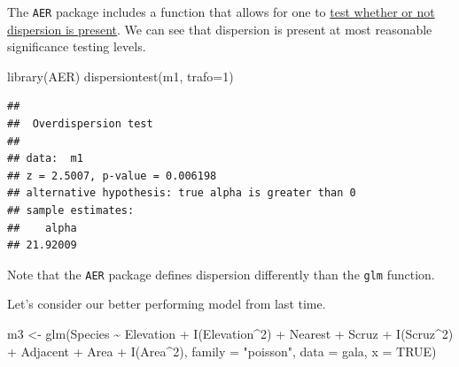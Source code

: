 \documentclass[
  ignorenonframetext,
]{beamer}
\newenvironment{Shaded}{\begin{snugshade}}{\end{snugshade}}
\newcommand{\AttributeTok}[1]{\textcolor[rgb]{0.77,0.63,0.00}{#1}}
\newcommand{\ConstantTok}[1]{\textcolor[rgb]{0.00,0.00,0.00}{#1}}
\newcommand{\DecValTok}[1]{\textcolor[rgb]{0.00,0.00,0.81}{#1}}
\newcommand{\FunctionTok}[1]{\textcolor[rgb]{0.00,0.00,0.00}{#1}}
\newcommand{\NormalTok}[1]{#1}
\newcommand{\OtherTok}[1]{\textcolor[rgb]{0.56,0.35,0.01}{#1}}
\newcommand{\SpecialCharTok}[1]{\textcolor[rgb]{0.00,0.00,0.00}{#1}}
\newcommand{\StringTok}[1]{\textcolor[rgb]{0.31,0.60,0.02}{#1}}
\begin{document}
\begin{frame}[fragile]{}
\protect\hypertarget{section-9}{}
The \texttt{AER} package includes a function that allows for one to
\href{https://www.sciencedirect.com/science/article/abs/pii/030440769090014K}{test
whether or not dispersion is present}. We can see that dispersion is
present at most reasonable significance testing levels.

\vspace{12pt}
\tiny

\begin{Shaded}
\begin{Highlighting}[]
\FunctionTok{library}\NormalTok{(AER)}
\FunctionTok{dispersiontest}\NormalTok{(m1, }\AttributeTok{trafo=}\DecValTok{1}\NormalTok{)}
\end{Highlighting}
\end{Shaded}

\begin{verbatim}
## 
##  Overdispersion test
## 
## data:  m1
## z = 2.5007, p-value = 0.006198
## alternative hypothesis: true alpha is greater than 0
## sample estimates:
##    alpha 
## 21.92009
\end{verbatim}

\vspace{12pt}
\normalsize

Note that the \texttt{AER} package defines dispersion differently than
the \texttt{glm} function.
\end{frame}

\begin{frame}[fragile]{}
\protect\hypertarget{section-10}{}
Let's consider our better performing model from last time.

\vspace{12pt}
\tiny

\begin{Shaded}
\begin{Highlighting}[]
\NormalTok{m3 }\OtherTok{\textless{}{-}} \FunctionTok{glm}\NormalTok{(Species }\SpecialCharTok{\textasciitilde{}}\NormalTok{ Elevation }\SpecialCharTok{+} \FunctionTok{I}\NormalTok{(Elevation}\SpecialCharTok{\^{}}\DecValTok{2}\NormalTok{) }\SpecialCharTok{+}\NormalTok{ Nearest }\SpecialCharTok{+}\NormalTok{ Scruz }\SpecialCharTok{+} 
            \FunctionTok{I}\NormalTok{(Scruz}\SpecialCharTok{\^{}}\DecValTok{2}\NormalTok{) }\SpecialCharTok{+}\NormalTok{ Adjacent }\SpecialCharTok{+} 
\NormalTok{            Area }\SpecialCharTok{+} \FunctionTok{I}\NormalTok{(Area}\SpecialCharTok{\^{}}\DecValTok{2}\NormalTok{), }\AttributeTok{family =} \StringTok{"poisson"}\NormalTok{, }\AttributeTok{data =}\NormalTok{ gala, }\AttributeTok{x =} \ConstantTok{TRUE}\NormalTok{)}
\end{Highlighting}
\end{Shaded}
\end{frame}
\end{document}
